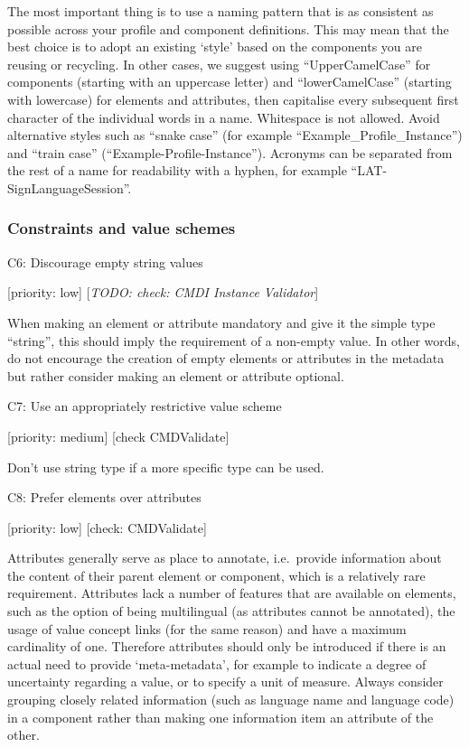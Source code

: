 \documentclass[]{article}
\begin{document}
The most important thing is to use a naming pattern that is as
consistent as possible across your profile and component definitions.
This may mean that the best choice is to adopt an existing `style' based
on the components you are reusing or recycling. In other cases, we
suggest using ``UpperCamelCase'' for components (starting with an
uppercase letter) and ``lowerCamelCase'' (starting with lowercase) for
elements and attributes, then capitalise every subsequent first
character of the individual words in a name. Whitespace is not allowed.
Avoid alternative styles such as ``snake case'' (for example
``Example\_Profile\_Instance'') and ``train case''
(``Example-Profile-Instance''). Acronyms can be separated from the rest
of a name for readability with a hyphen, for example
``LAT-SignLanguageSession''.

\hypertarget{constraints-and-value-schemes}{\subsubsection{Constraints
and value schemes}\label{constraints-and-value-schemes}}

C6: Discourage empty string values

{[}priority: low{]} {[}\emph{TODO: check: CMDI Instance Validator}{]}

When making an element or attribute mandatory and give it the simple
type ``string'', this should imply the requirement of a non-empty value.
In other words, do not encourage the creation of empty elements or
attributes in the metadata but rather consider making an element or
attribute optional.

C7: Use an appropriately restrictive value scheme

{[}priority: medium{]} {[}check CMDValidate{]}

Don't use string type if a more specific type can be used.

C8: Prefer elements over attributes

{[}priority: low{]} {[}check: CMDValidate{]}

Attributes generally serve as place to annotate, i.e.~provide
information about the content of their parent element or component,
which is a relatively rare requirement. Attributes lack a number of
features that are available on elements, such as the option of being
multilingual (as attributes cannot be annotated), the usage of value
concept links (for the same reason) and have a maximum cardinality of
one. Therefore attributes should only be introduced if there is an
actual need to provide `meta-metadata', for example to indicate a degree
of uncertainty regarding a value, or to specify a unit of measure.
Always consider grouping closely related information (such as language
name and language code) in a component rather than making one
information item an attribute of the other.
\end{document}
